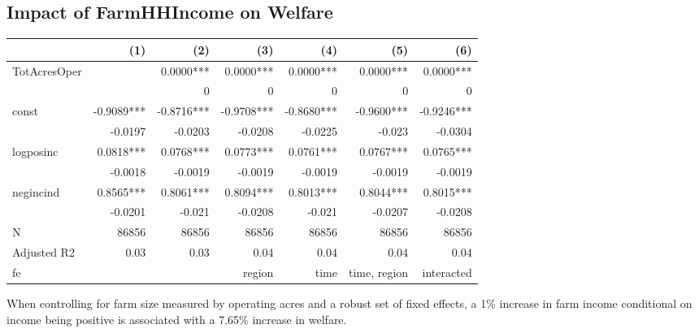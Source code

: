 \documentclass[11pt]{article}
\begin{document}
\subsection{Impact of FarmHHIncome on Welfare}
\label{sec:orgf40c572}

\begin{center}
\begin{tabular}{lrrrrrr}
\hline
 & (1) & (2) & (3) & (4) & (5) & (6)\\[0pt]
\hline
TotAcresOper &  & 0.0000*** & 0.0000*** & 0.0000*** & 0.0000*** & 0.0000***\\[0pt]
 &  & 0 & 0 & 0 & 0 & 0\\[0pt]
const & -0.9089*** & -0.8716*** & -0.9708*** & -0.8680*** & -0.9600*** & -0.9246***\\[0pt]
 & -0.0197 & -0.0203 & -0.0208 & -0.0225 & -0.023 & -0.0304\\[0pt]
logposinc & 0.0818*** & 0.0768*** & 0.0773*** & 0.0761*** & 0.0767*** & 0.0765***\\[0pt]
 & -0.0018 & -0.0019 & -0.0019 & -0.0019 & -0.0019 & -0.0019\\[0pt]
negincind & 0.8565*** & 0.8061*** & 0.8094*** & 0.8013*** & 0.8044*** & 0.8015***\\[0pt]
 & -0.0201 & -0.021 & -0.0208 & -0.021 & -0.0207 & -0.0208\\[0pt]
N & 86856 & 86856 & 86856 & 86856 & 86856 & 86856\\[0pt]
Adjusted R2 & 0.03 & 0.03 & 0.04 & 0.04 & 0.04 & 0.04\\[0pt]
fe &  &  & region & time & time, region & interacted\\[0pt]
\end{tabular}
\end{center}

When controlling for farm size measured by operating acres and a robust set of fixed effects, a 1\% increase in farm income conditional on income being positive is associated with a 7.65\% increase in welfare. 
\end{document}
